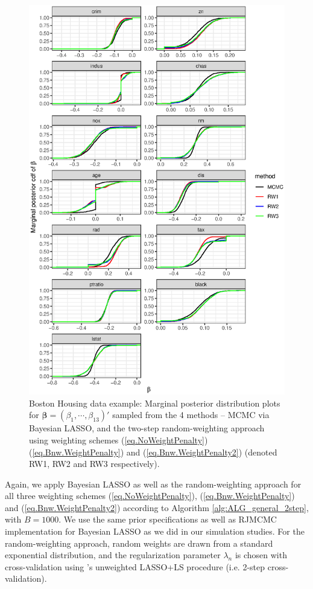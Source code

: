 \documentclass[ejs,authoryear,linksfromyear]{imsart}
\numberwithin{equation}{section}
\theoremstyle{plain}
\begin{document}
\begin{figure}[!]
	\centering
	\includegraphics[scale=0.72]{boston_beta_cdf}
	\caption{Boston Housing data example: Marginal posterior distribution plots for $\bm{\beta} = (\beta_1, \cdots, \beta_{13})'$ sampled from the 4 methods -- MCMC via Bayesian LASSO, and the two-step random-weighting approach using weighting schemes (\ref{eq.NoWeightPenalty}) (\ref{eq.Bnw.WeightPenalty}) and (\ref{eq.Bnw.WeightPenalty2}) (denoted RW1, RW2 and RW3 respectively).}
	\label{fig:boston_beta_cdf}
\end{figure}

Again, we apply Bayesian LASSO as well as the random-weighting approach for all three weighting schemes (\ref{eq.NoWeightPenalty}), (\ref{eq.Bnw.WeightPenalty}) and (\ref{eq.Bnw.WeightPenalty2}) according to Algorithm \ref{alg:ALG_general_2step}, with $B=1000$.  We use the same prior specifications as well as RJMCMC implementation for Bayesian LASSO as we did in our simulation studies. For the random-weighting approach, random weights are drawn from a standard exponential distribution, and the regularization parameter $\lambda_n$ is chosen with cross-validation using \citet{Liu&Yu}'s unweighted LASSO+LS procedure (i.e. 2-step cross-validation). 
\end{document}
